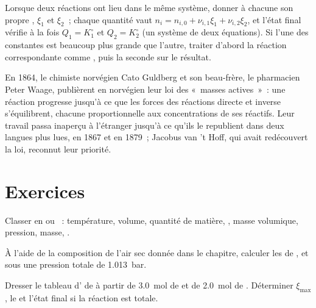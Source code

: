 \begin{method}\label{met:b1:extent-q-and-k:two-reactions}
Lorsque deux réactions ont lieu dans le même système, donner à chacune
son propre , $\xi_1$ et $\xi_2$~; chaque quantité vaut $n_i = n_{i,0} + \nu_{i,1}\xi_1
+ \nu_{i,2}\xi_2$, et l'état final vérifie à la fois $Q_1 = K_1^\circ$ et
$Q_2 = K_2^\circ$ (un système de deux équations). Si l'une des
constantes est beaucoup plus grande que l'autre, traiter d'abord la
réaction correspondante comme , puis la seconde sur le
résultat.
\end{method}

\begin{history}
En 1864, le chimiste norvégien Cato Guldberg et son beau-frère, le
pharmacien Peter Waage, publièrent en norvégien leur loi des «~masses
actives~»~: une réaction progresse jusqu'à ce que les forces des
réactions directe et inverse s'équilibrent, chacune proportionnelle aux
concentrations de ses réactifs. Leur travail passa inaperçu à l'étranger
jusqu'à ce qu'ils le republient dans deux langues plus lues, en 1867 et
en 1879~; Jacobus van 't Hoff, qui avait redécouvert la loi, reconnut
leur priorité.
\end{history}

\section{Exercices}

\begin{exercise}[$\star$]\label{exo:b1:extent-q-and-k:1}
Classer en  ou ~: température, volume, quantité de
matière, , masse volumique, pression, masse,
.
\end{exercise}

\begin{exercise}[$\star$]\label{exo:b1:extent-q-and-k:2}
À l'aide de la composition de l'air sec donnée dans le chapitre, calculer
les  de ,  et  sous une pression
totale de \qty{1.013}{bar}.
\end{exercise}

\begin{exercise}[$\star$]\label{exo:b1:extent-q-and-k:3}
Dresser le tableau d' de  à partir de
\qty{3.0}{mol} de  et de \qty{2.0}{mol} de . Déterminer
$\xi_{\max}$, le  et l'état final si la réaction est
totale.
\end{exercise}

